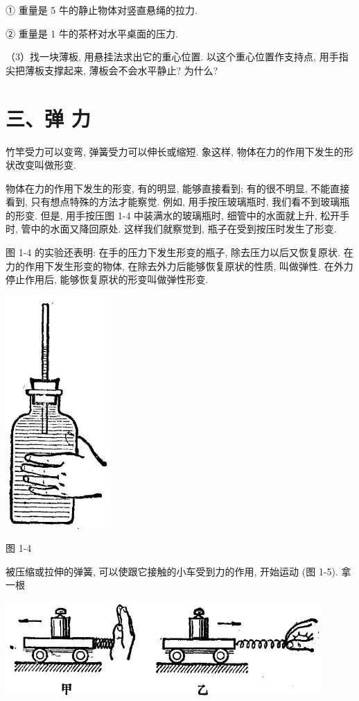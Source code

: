 \documentclass[10pt]{article}
\begin{document}
① 重量是 5 牛的静止物体对竖直悬绳的拉力.

② 重量是 1 牛的茶杯对水平桌面的压力.

（3）找一块薄板, 用悬挂法求出它的重心位置. 以这个重心位置作支持点, 用手指尖把薄板支撑起来, 薄板会不会水平静止? 为什么?

\section*{三、弹 力}

竹竿受力可以变弯, 弹簧受力可以伸长或缩短. 象这样, 物体在力的作用下发生的形状改变叫做形变.

物体在力的作用下发生的形变, 有的明显, 能够直接看到; 有的很不明显, 不能直接看到, 只有想点特殊的方法才能察觉. 例如, 用手按压玻璃瓶时, 我们看不到玻璃瓶的形变. 但是, 用手按压图 1-4 中装满水的玻璃瓶时, 细管中的水面就上升, 松开手时, 管中的水面又降回原处. 这样我们就察觉到, 瓶子在受到按压时发生了形变.

图 1-4 的实验还表明: 在手的压力下发生形变的瓶子, 除去压力以后又恢复原状. 在力的作用下发生形变的物体, 在除去外力后能够恢复原状的性质, 叫做弹性. 在外力停止作用后, 能够恢复原状的形变叫做弹性形变.

\begin{center}
\includegraphics[max width=0.3\textwidth]{images/01912d55-147c-70aa-b0e0-1782a122f948_21_435685.jpg}
\end{center}

图 1-4

被压缩或拉伸的弹簧, 可以使跟它接触的小车受到力的作用, 开始运动 (图 1-5). 拿一根

\begin{center}
\includegraphics[max width=0.9\textwidth]{images/01912d55-147c-70aa-b0e0-1782a122f948_21_521571.jpg}
\end{center}
\end{document}
